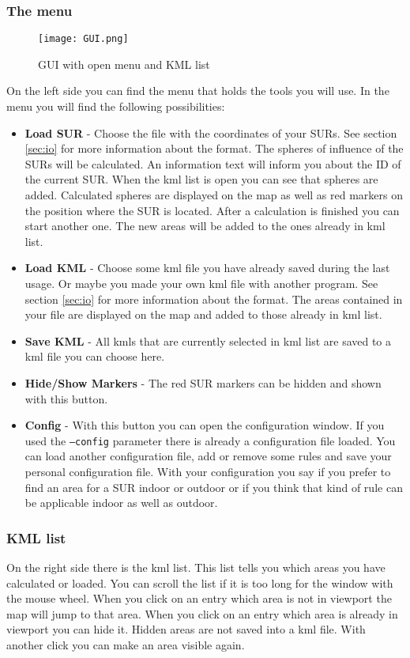 \documentclass[11pt,fleqn]{book} %
\newcommand{\todol}{\todo[inline]} %
\begin{document}
\subsubsection{The menu}
\begin{figure}
\centering
\texttt{[image: GUI.png]}
\caption{GUI with open menu and KML list}
\todol{update}
\end{figure}
On the left side you can find the menu that holds the tools you will use. In the menu you will find the following possibilities:
\begin{itemize}
	\item \textbf{Load SUR} - Choose the file with the coordinates of your SURs. See section \ref{sec:io} for more information about the format. The spheres of influence of the SURs will be calculated. An information text will inform you about the ID of the current SUR. When the kml list is open you can see that spheres are added. Calculated spheres are displayed on the map as well as red markers on the position where the SUR is located. After a calculation is finished you can start another one. The new areas will be added to the ones already in kml list.
	\item \textbf{Load KML} - Choose some kml file you have already saved during the last usage. Or maybe you made your own kml file with another program. See section \ref{sec:io} for more information about the format. The areas contained in your file are displayed on the map and added to those already in kml list.
	\item \textbf{Save KML} - All kmls that are currently selected in kml list are saved to a kml file you can choose here.
	\item \textbf{Hide/Show Markers} - The red SUR markers can be hidden and shown with this button.
	\item \textbf{Config} - With this button you can open the configuration window. If you used the \texttt{--config} parameter there is already a configuration file loaded. You can load another configuration file, add or remove some rules and save your personal configuration file. With your configuration you say if you prefer to find an area for a SUR indoor or outdoor or if you think that kind of rule can be applicable indoor as well as outdoor.
\end{itemize}

\subsubsection{KML list}
On the right side there is the kml list. This list tells you which areas you have calculated or loaded. You can scroll the list if it is too long for the window with the mouse wheel. When you click on an entry which area is not in viewport the map will jump to that area. When you click on an entry which area is already in viewport you can hide it. Hidden areas are not saved into a kml file. With another click you can make an area visible again.
\end{document}

